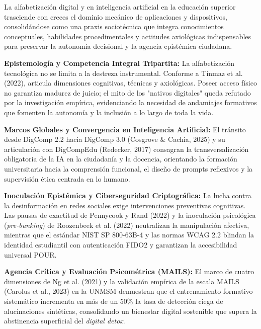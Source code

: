 La alfabetización digital y en inteligencia artificial en la educación superior trasciende con creces el dominio mecánico de aplicaciones y dispositivos, consolidándose como una praxis sociotécnica que integra conocimientos conceptuales, habilidades procedimentales y actitudes axiológicas indispensables para preservar la autonomía decisional y la agencia epistémica ciudadana.

\vspace{0.4cm}

\begin{resumenlist}
    \item \textbf{Epistemología y Competencia Integral Tripartita:} La alfabetización tecnológica no se limita a la destreza instrumental. Conforme a Tinmaz et al. (2022), articula dimensiones cognitivas, técnicas y axiológicas. Poseer acceso físico no garantiza madurez de juicio; el mito de los "nativos digitales" queda refutado por la investigación empírica, evidenciando la necesidad de andamiajes formativos que fomenten la autonomía y la inclusión a lo largo de toda la vida.
    \item \textbf{Marcos Globales y Convergencia en Inteligencia Artificial:} El tránsito desde DigComp 2.2 hacia DigComp 3.0 (Cosgrove \& Cachia, 2025) y su articulación con DigCompEdu (Redecker, 2017) consagran la transversalización obligatoria de la IA en la ciudadanía y la docencia, orientando la formación universitaria hacia la comprensión funcional, el diseño de prompts reflexivos y la supervisión ética centrada en lo humano.
    \item \textbf{Inoculación Epistémica y Ciberseguridad Criptográfica:} La lucha contra la desinformación en redes sociales exige intervenciones preventivas cognitivas. Las pausas de exactitud de Pennycook y Rand (2022) y la inoculación psicológica (\textit{pre-bunking}) de Roozenbeek et al. (2022) neutralizan la manipulación afectiva, mientras que el estándar NIST SP 800-63B-4 y las normas WCAG 2.2 blindan la identidad estudiantil con autenticación FIDO2 y garantizan la accesibilidad universal POUR.
    \item \textbf{Agencia Crítica y Evaluación Psicométrica (MAILS):} El marco de cuatro dimensiones de Ng et al. (2021) y la validación empírica de la escala MAILS (Carolus et al., 2023) en la UNMSM demuestran que el entrenamiento formativo sistemático incrementa en más de un 50\% la tasa de detección ciega de alucinaciones sintéticas, consolidando un bienestar digital sostenible que supera la abstinencia superficial del \textit{digital detox}.
\end{resumenlist}


